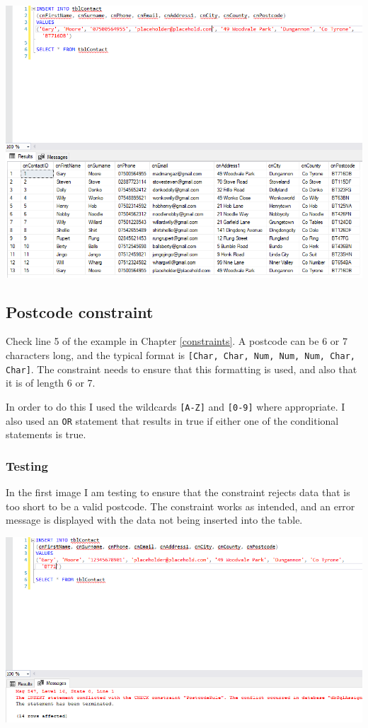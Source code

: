 \documentclass[11pt,a4paper]{scrartcl}
\begin{document}
	\begin{center}
		\includegraphics[width=0.9\linewidth]{images/EmailConstraintTest3}
	\end{center}
	
	\subsection{Postcode constraint}\label{postcodeconstraint}
	
	Check line 5 of the example in Chapter \ref{constraints}. A postcode can be 6 or 7 characters long, and the typical format is \texttt{[Char, Char, Num, Num, Num, Char, Char]}. The constraint needs to ensure that this formatting is used, and also that it is of length 6 or 7.
	
	In order to do this I used the wildcards \texttt{[A-Z]} and \texttt{[0-9]} where appropriate. I also used an \texttt{OR} statement that results in true if either one of the conditional statements is true.
	
	\subsubsection*{Testing}
	
	In the first image I am testing to ensure that the constraint rejects data that is too short to be a valid postcode. The constraint works as intended, and an error message is displayed with the data not being inserted into the table.
	
	\begin{center}
		\includegraphics[width=0.9\linewidth]{images/PostcodeConstraintTest1}
	\end{center}
	
\end{document}
